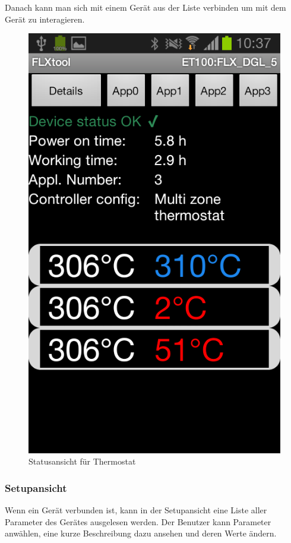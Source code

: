 Danach kann man sich mit einem Gerät aus der Liste verbinden um mit dem Gerät zu interagieren.
\vspace{16pt}

\begin{figure}
	\includegraphics[scale=0.3]{analysis/res/ShowStatusThermostat}
	\caption{Statusansicht für Thermostat}
\end{figure}

\subsubsection{Setupansicht}
\label{subsubsec:Setupansicht}
Wenn ein Gerät verbunden ist, kann in der Setupansicht eine Liste aller Parameter des Gerätes ausgelesen werden. Der Benutzer kann Parameter anwählen, eine kurze Beschreibung dazu ansehen und deren Werte ändern.

